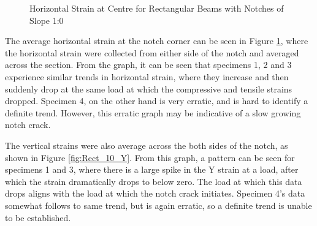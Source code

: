 \documentclass[11pt,a4paper]{article}
\numberwithin{equation}{subsection}
\begin{document}
\begin{figure}[h]
	\begin{center}
	\end{center}
	\caption{Horizontal Strain at Centre for Rectangular Beams with Notches of Slope 1:0}
	\label{fig:Rect_10_Z}
\end{figure}
\pagebreak

\noindent
The average horizontal strain at the notch corner can be seen in Figure \ref{fig:Rect_10_Z}, where the horizontal strain were collected from either side of the notch and averaged across the section. From the graph, it can be seen that specimens 1, 2 and 3 experience similar trends in horizontal strain, where they increase and then suddenly drop at the same load at which the compressive and tensile strains dropped. Specimen 4, on the other hand is very erratic, and is hard to identify a definite trend. However, this erratic graph may be indicative of a slow growing notch crack.

\vspace*{\baselineskip}

\noindent
The vertical strains were also average across the both sides of the notch, as shown in Figure \ref{fig:Rect_10_Y}. From this graph, a pattern can be seen for specimens 1 and 3, where there is a large spike in the Y strain at a load, after which the strain dramatically drops to below zero. The load at which this data drops aligns with the load at which the notch crack initiates. Specimen 4's data somewhat follows to same trend, but is again erratic, so a definite trend is unable to be established. 
\end{document}
